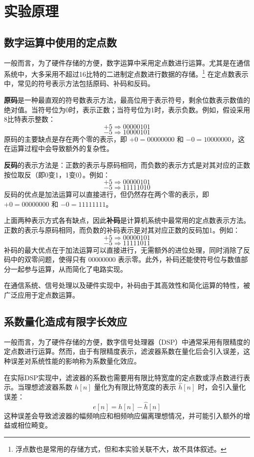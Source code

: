 \documentclass[lang=cn,newtx,10pt,scheme=chinese]{elegantbook}
\begin{document}
\section{实验原理}
\subsection{数字运算中使用的定点数}
一般而言，为了硬件存储的方便，数字运算中采用定点数进行运算。尤其是在通信系统中，大多采用不超过16比特的二进制定点数进行数据的存储。\footnote{浮点数也是常用的存储方式，但和本实验关联不大，故不具体叙述。}
在定点数表示中，常见的符号表示方法包括原码、补码和反码。

\textbf{原码}是一种最直观的符号数表示方法，最高位用于表示符号，剩余位数表示数值的绝对值。当符号位为0时，表示正数；当符号位为1时，表示负数。例如，假设采用8比特表示整数：
\[
+5 \Rightarrow 00000101
\]
\[
-5 \Rightarrow 10000101
\]
原码的主要缺点是存在两个零的表示，即 \(+0 = 00000000\) 和 \(-0 = 10000000\)，这在运算过程中会导致额外的复杂性。


\textbf{反码}的表示方法是：正数的表示与原码相同，而负数的表示方式是对其对应的正数按位取反（即0变1，1变0）。例如：
\[
+5 \Rightarrow 00000101
\]
\[
-5 \Rightarrow 11111010
\]
反码的优点是加法运算可以直接进行，但仍然存在两个零的表示，即 \(+0 = 00000000\) 和 \(-0 = 11111111\)。


上面两种表示方式各有缺点，因此\textbf{补码}是计算机系统中最常用的定点数表示方法。正数的表示与原码相同，而负数的补码表示是对其对应正数的反码加1。例如：
\[
+5 \Rightarrow 00000101
\]
\[
-5 \Rightarrow 11111011
\]
补码的最大优点在于加法运算可以直接进行，无需额外的进位处理，同时消除了反码中的双零问题，使得只有 \(00000000\) 表示零。此外，补码还能使符号位与数值部分一起参与运算，从而简化了电路实现。

在通信系统、信号处理以及硬件实现中，补码由于其高效性和简化运算的特性，被广泛应用于定点数运算。
\subsection{系数量化造成有限字长效应}
一般而言，为了硬件存储的方便，数字信号处理器（DSP）中通常采用有限精度的定点数进行运算。然而，由于有限精度表示，滤波器系数在量化后会引入误差，这种误差对系统性能的影响称为系数量化效应。

在实际DSP实现中，滤波器的系数也需要用有限比特宽度的定点数或浮点数进行表示。当理想滤波器系数 \( h[n] \) 量化为有限比特宽度的表示 \( \hat{h}[n] \) 时，会引入量化误差：
\begin{equation}
e[n] = h[n] - \hat{h}[n]
\end{equation}
这种误差会导致滤波器的幅频响应和相频响应偏离理想情况，并可能引入额外的增益或相位畸变。
\end{document}
